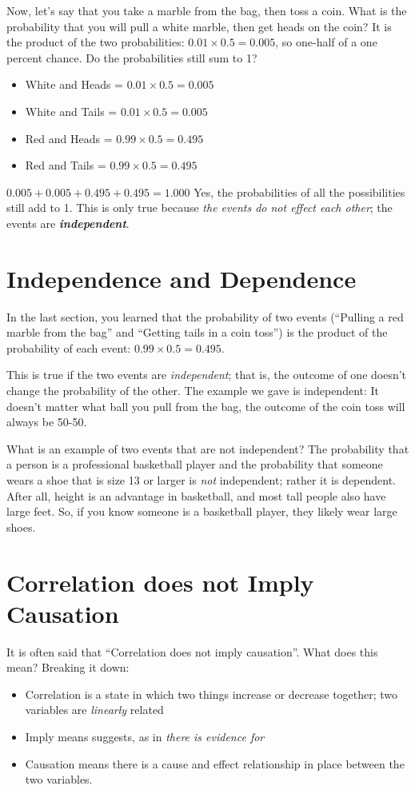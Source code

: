 Now, let's say that you take a marble from the bag, then
toss a coin. What is the probability that you will pull a white marble, then get heads on the coin? It is the product of the two
probabilities: $0.01 \times 0.5 = 0.005$, so one-half of a one percent
chance. Do the probabilities still sum to 1?
\begin{itemize}
\item White and Heads = $0.01 \times 0.5 = 0.005$
\item White and Tails = $0.01 \times 0.5 = 0.005$
\item Red and Heads = $0.99 \times 0.5 = 0.495$
\item Red and Tails = $0.99 \times 0.5 = 0.495$
\end{itemize}
$0.005 + 0.005 + 0.495 + 0.495 = 1.000$
Yes, the probabilities of all the possibilities still add to 1. This is only true because \emph{the events do not effect each other}; the events are \textbf{\textit{independent}}. 
\section{Independence and Dependence}

In the last section, you learned that the probability of two events
(``Pulling a red marble from the bag'' and ``Getting tails in a coin
toss'') is the product of the probability of each event: $0.99 \times 0.5 = 0.495$.

This is true if the two events are \textit{independent}; that is, the
outcome of one doesn't change the probability of the other. The
example we gave is independent: It doesn't matter what ball you pull
from the bag, the outcome of the coin toss will always be 50-50.

What is an example of two events that are not independent? The probability that a
person is a professional basketball player and the probability that
someone wears a shoe that is size 13 or larger is \textit{not}
independent; rather it is dependent. After all, height is an advantage in basketball, and most
tall people also have large feet. So, if you know someone is a
basketball player, they likely wear large shoes.

\section{Correlation does not Imply Causation}
It is often said that ``Correlation does not imply causation''. What does this mean? 
Breaking it down:
\begin{itemize}
  \item Correlation is a state in which two things increase or decrease together; two variables are \emph{linearly} related
  \item Imply means suggests, as in \textit{there is evidence for}
  \item Causation means there is a cause and effect relationship in place between the two variables. 
\end{itemize}

